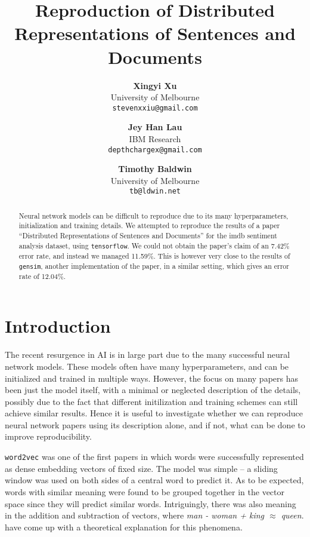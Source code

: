 \documentclass{article}
\begin{document}
\title{Reproduction of Distributed Representations of Sentences and Documents}

\author{
  \textbf{Xingyi Xu} \\ University of Melbourne \\ \texttt{stevenxxiu@gmail.com} \and
  \textbf{Jey Han Lau} \\ IBM Research \\ \texttt{depthchargex@gmail.com} \and
  \textbf{Timothy Baldwin} \\ University of Melbourne \\ \texttt{tb@ldwin.net}
}
\maketitle

\begin{abstract}
Neural network models can be difficult to reproduce due to its many hyperparameters, initialization and training details. We attempted to reproduce the results of a paper ``Distributed Representations of Sentences and Documents'' for the imdb sentiment analysis dataset, using \texttt{tensorflow}. We could not obtain the paper's claim of an 7.42\% error rate, and instead we managed 11.59\%. This is however very close to the results of \texttt{gensim}, another implementation of the paper, in a similar setting, which gives an error rate of 12.04\%.
\end{abstract}

\section{Introduction}
The recent resurgence in AI is in large part due to the many successful neural network models. These models often have many hyperparameters, and can be initialized and trained in multiple ways. However, the focus on many papers has been just the model itself, with a minimal or neglected description of the details, possibly due to the fact that different initilization and training schemes can still achieve similar results. Hence it is useful to investigate whether we can reproduce neural network papers using its description alone, and if not, what can be done to improve reproducibility.

\texttt{word2vec} \citep{mikolov_distributed_2013} was one of the first papers in which words were successfully represented as dense embedding vectors of fixed size. The model was simple -- a sliding window was used on both sides of a central word to predict it. As to be expected, words with similar meaning were found to be grouped together in the vector space since they will predict similar words. Intriguingly, there was also meaning in the addition and subtraction of vectors, where \textit{man - woman + king $\approx$ queen}. \cite{arora_rand-walk:_2015} have come up with a theoretical explanation for this phenomena.
\end{document}
